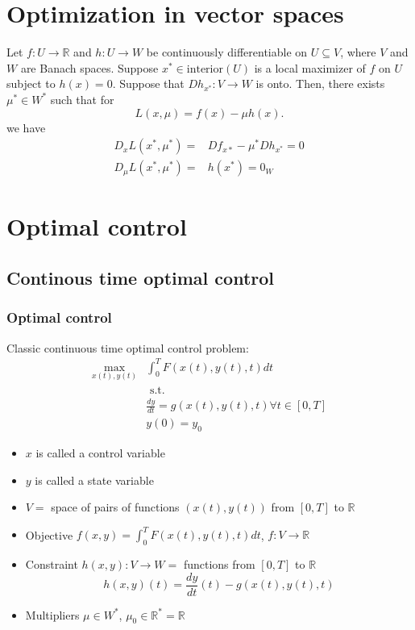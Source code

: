 \documentclass[compress]{beamer}
\def\R{\mathbb{R}}
\renewcommand{\to}{{\rightarrow}}
\begin{document}
\section{Optimization in vector spaces}

\begin{frame} 
  \begin{theorem} \label{thm:econv} Let $f:U \to \R$ and $h:U \to W$ be
    continuously differentiable on $U \subseteq V$, where $V$ and $W$
    are Banach spaces.  Suppose $x^* \in \mathrm{interior}(U)$ is a
    local maximizer of $f$ on $U$ subject to $h(x) = 0$. Suppose that
    $Dh_{x^*}:V \to W$ is onto. Then, there exists $\mu^* \in W^\ast$
    such that for
    \[ L(x,\mu) = f(x) - \mu h(x). \]
    we have
    \begin{align*}
      D_xL(x^*,\mu^*) = & Df_{x*} - \mu^* Dh_{x^*} = 0_{} \\
      D_\mu L(x^*,\mu^*) = & h(x^*) = 0_{W}
    \end{align*}
  \end{theorem}
\end{frame}

\section{Optimal control}

\subsection{Continous time optimal control}
\begin{frame}[shrink] 
  \frametitle{Optimal control}
  Classic continuous time optimal control problem:
  \begin{align*}
    \max_{x(t),y(t)} & \int_0^T F(x(t),y(t),t) dt \\
    & \text{ s.t.} \\
    & \frac{d y}{dt} = g(x(t),y(t),t) \forall t \in [0,T] \\ 
    & y(0) = y_0
  \end{align*}
  \begin{itemize}
  \item $x$ is called a control variable
  \item $y$ is called a state variable
  \item $V =$ space of pairs of functions $(x(t),y(t))$ from
    $[0,T]$ to $\R$
  \item Objective $f(x,y) = \int_0^T F(x(t),y(t),t) dt$, $f:V \to \R$
  \item Constraint $h(x,y): V \to W = $ functions from $[0,T]$ to $\R$
    \[ h(x,y)(t) = \frac{dy}{dt}(t) - g(x(t),y(t),t) \]
  \item Multipliers $\mu \in W^\ast$, $\mu_0 \in \R^\ast = \R$
  \end{itemize}
\end{frame}
\end{document}

